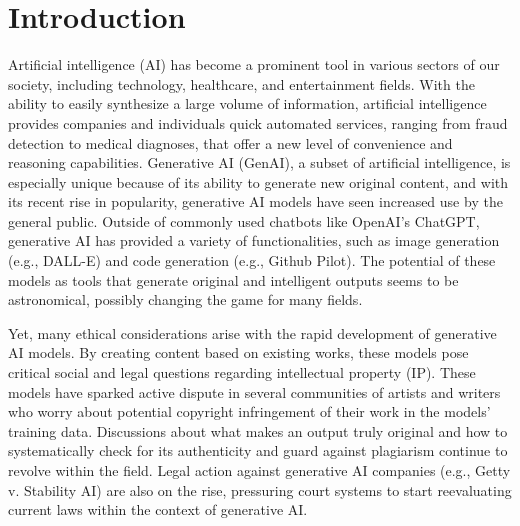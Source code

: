 \documentclass[manuscript,screen]{acmart}
\begin{document}


\maketitle

\section{Introduction}
Artificial intelligence (AI) has become a prominent tool in various sectors of our society, including technology, healthcare, and entertainment fields. With the ability to easily synthesize a large volume of information, artificial intelligence provides companies and individuals quick automated services, ranging from fraud detection to medical diagnoses, that offer a new level of convenience and reasoning capabilities. Generative AI (GenAI), a subset of artificial intelligence, is especially unique because of its ability to generate new original content, and with its recent rise in popularity, generative AI models have seen increased use by the general public. Outside of commonly used chatbots like OpenAI’s ChatGPT, generative AI has provided a variety of functionalities, such as image generation (e.g., DALL-E) and code generation (e.g., Github Pilot). The potential of these models as tools that generate original and intelligent outputs seems to be astronomical, possibly changing the game for many fields. 

Yet, many ethical considerations arise with the rapid development of generative AI models. By creating content based on existing works, these models pose critical social and legal questions regarding intellectual property (IP). These models have sparked active dispute in several communities of artists and writers who worry about potential copyright infringement of their work in the models' training data. Discussions about what makes an output truly original and how to systematically check for its authenticity and guard against plagiarism continue to revolve within the field. Legal action against generative AI companies (e.g., Getty v. Stability AI) are also on the rise, pressuring court systems to start reevaluating current laws within the context of generative AI. 
\end{document}
